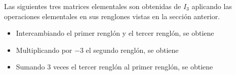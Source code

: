 \newpage

\begin{examplebox}{}{}
    Las siguientes tres matrices elementales son obtenidas de $I_3$ aplicando las operaciones elementales en sus renglones vistas en la sección anterior.
    \begin{itemize}[topsep=6pt, itemsep=0pt]
        \item Intercambiando el primer renglón y el tercer renglón, se obtiene
        \begin{matrizn}
        \end{matrizn}
        \item Multiplicando por $-3$ el segundo renglón, se obtiene
        \begin{matrizn}
        \end{matrizn}
        \item Sumando 3 veces el tercer renglón al primer renglón, se obtiene
        \begin{matrizn}
        \end{matrizn}
    \end{itemize}
\end{examplebox}

